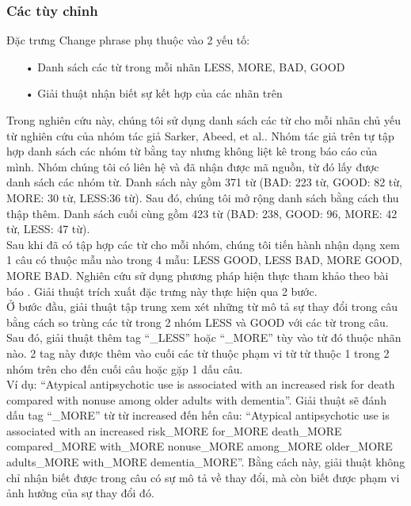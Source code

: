 \subsubsection*{Các tùy chỉnh}
Đặc trưng Change phrase phụ thuộc vào 2 yếu tố:
\begin{itemize}[noitemsep]
\item[•] Danh sách các từ trong mỗi nhãn LESS, MORE, BAD, GOOD
\item[•] Giải thuật nhận biết sự kết hợp của các nhãn trên
\end{itemize}
Trong nghiên cứu này, chúng tôi sử dụng danh sách các từ cho mỗi nhãn chủ yếu từ nghiên cứu của nhóm tác giả Sarker, Abeed, et al.\cite{sarker2011outcome}. Nhóm tác giả trên tự tập hợp danh sách các nhóm từ bằng tay nhưng không liệt kê trong báo cáo của mình. Nhóm chúng tôi có liên hệ và đã nhận được mã nguồn, từ đó lấy được danh sách các nhóm từ. Danh sách này gồm 371 từ (BAD: 223 từ, GOOD: 82 từ, MORE: 30 từ, LESS:36 từ). Sau đó, chúng tôi mở rộng danh sách bằng cách thu thập thêm. Danh sách cuối cùng gồm 423 từ (BAD: 238, GOOD: 96, MORE: 42 từ, LESS: 47 từ).\\

Sau khi đã có tập hợp các từ cho mỗi nhóm, chúng tôi tiến hành nhận dạng xem 1 câu có thuộc mẫu nào trong 4 mẫu: LESS GOOD, LESS BAD, MORE GOOD, MORE BAD. Nghiên cứu sử dụng phương pháp hiện thực tham khảo theo bài báo \cite{niu2005analysis}. Giải thuật trích xuất đặc trưng này thực hiện qua 2 bước.\\

Ở bước đầu, giải thuật tập trung xem xét những từ mô tả sự thay đổi trong câu bằng cách so trùng các từ trong 2 nhóm LESS và GOOD với các từ trong câu. Sau đó, giải thuật thêm tag ``\_LESS'' hoặc ``\_MORE'' tùy vào từ đó thuộc nhãn nào. 2 tag này được thêm vào cuối các từ thuộc phạm vi từ từ thuộc 1 trong 2 nhóm trên cho đến cuối câu hoặc gặp 1 dấu câu. \\

Ví dụ: “Atypical antipsychotic use is associated with an increased risk for death compared with nonuse among older adults with dementia”. Giải thuật sẽ đánh dấu tag ``\_MORE'' từ từ increased đến hến câu: ``Atypical antipsychotic use is associated with an increased risk\_MORE for\_MORE death\_MORE compared\_MORE with\_MORE nonuse\_MORE among\_MORE older\_MORE adults\_MORE with\_MORE dementia\_MORE''. Bằng cách này, giải thuật không chỉ nhận biết được trong câu có sự mô tả về thay đổi, mà còn biết được phạm vi ảnh hưởng của sự thay đổi đó.
